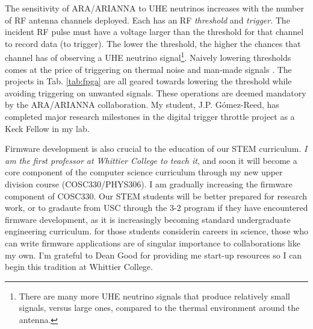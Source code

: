 \documentclass[../../main.tex]{subfiles}
\begin{document}
The sensitivity of ARA/ARIANNA to UHE neutrinos increases with the number of RF antenna channels deployed.  Each has an RF \textit{threshold} and \textit{trigger}.  The incident RF pulse must have a voltage larger than the threshold for that channel to record data (to trigger).  The lower the threshold, the higher the chances that channel has of observing a UHE neutrino signal\footnote{There are many more UHE neutrino signals that produce relatively small signals, versus large ones, compared to the thermal environment around the antenna.}.  Naively lowering thresholds comes at the price of triggering on thermal noise and man-made signals \cite{ALLISON201847} \cite{barwick2016radio}.  The projects in Tab. \ref{tab:fpga} are all geared towards lowering the threshold while avoiding triggering on unwanted signals.  These operations are deemed mandatory by the ARA/ARIANNA collaboration.  My student, J.P. G\'{o}mez-Reed, has completed major research milestones in the digital trigger throttle project as a Keck Fellow in my lab. \\ \hspace{0.1cm}

Firmware development is also crucial to the education of our STEM curriculum.  \textit{I am the first professor at Whittier College to teach it}, and soon it will become a core component of the computer science curriculum through my new upper division course (COSC330/PHYS306).  I am gradually increasing the firmware component of COSC330.  Our STEM students will be better prepared for research work, or to gradaute from USC through the 3-2 program if they have encountered firmware development, as it is increasingly becoming standard undergraduate engineering curriculum.  for those students considerin careers in science, those who can write firmware applications are of singular importance to collaborations like my own.  I'm grateful to Dean Good for providing me start-up resources so I can begin this tradition at Whittier College.
\end{document}
